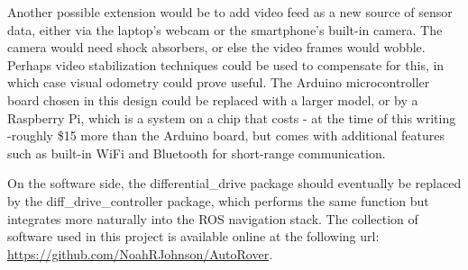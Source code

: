 


Another possible extension would be to add video feed as a new source of sensor data, either via the laptop's webcam or the smartphone's built-in camera. The camera would need shock absorbers, or else the video frames would wobble. Perhaps video stabilization techniques could be used to compensate for this, in which case visual odometry could prove useful. The Arduino microcontroller board chosen in this design could be replaced with a larger model, or by a Raspberry Pi, which is a system on a chip that costs - at the time of this writing -roughly \$15 more than the Arduino board, but comes with additional features such as built-in WiFi and Bluetooth for short-range communication. 

On the software side, the differential\_drive package should eventually be replaced by the diff\_drive\_controller package, which performs the same function but integrates more naturally into the ROS navigation stack. The collection of software used in this project is available online at the following url: \url{https://github.com/NoahRJohnson/AutoRover}.





